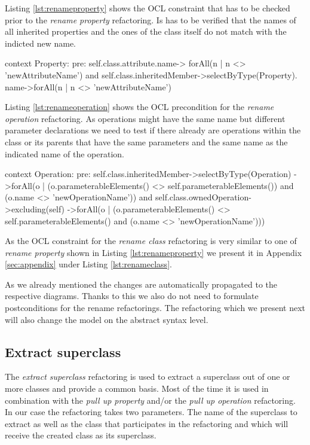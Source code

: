 \documentclass{llncs}
\begin{document}
Listing \ref{lst:renameproperty} shows the OCL constraint that has to be checked prior to the \textit{rename property} 
refactoring. Is has to be verified that the names of all inherited properties and the ones of the class itself do not match 
with the indicted new name.

\begin{lstsingle}[language=OCL,caption=OCL for \textit{rename property} refactoring,label=lst:renameproperty]
context Property:
pre:  self.class.attribute.name->
        forAll(n | n <> 'newAttributeName') 
      and 
      self.class.inheritedMember->selectByType(Property).
        name->forAll(n | n <> 'newAttributeName')
\end{lstsingle}

Listing \ref{lst:renameoperation} shows the OCL precondition for the \textit{rename operation} refactoring. As operations 
might have the same name but different parameter declarations we need to test if there already are operations within the 
class or its parents that have the same parameters and the same name as the indicated name of the operation.

\begin{lstsingle}[language=OCL,caption=OCL for \textit{rename operation} refactoring,label=lst:renameoperation]
context Operation:
pre:  self.class.inheritedMember->selectByType(Operation)
        ->forAll(o | (o.parameterableElements() <> 
          self.parameterableElements()) 
          and (o.name <> 'newOperationName')) 
      and 
      self.class.ownedOperation->excluding(self)
        ->forAll(o | (o.parameterableElements() <> 
          self.parameterableElements() 
          and (o.name <> 'newOperationName')))
\end{lstsingle}

As the OCL constraint for the \textit{rename class} refactoring is very similar to one of \textit{rename property} shown 
in Listing \ref{lst:renameproperty} we present it in Appendix \ref{sec:appendix} under Listing \ref{lst:renameclass}.

As we already mentioned the changes are automatically propagated to the respective diagrams. Thanks to this we also do 
not need to formulate postconditions for the rename refactorings. The refactoring which we present next will also 
change the model on the abstract syntax level.

\subsection{Extract superclass}
\label{sec:extract}
The \textit{extract superclass} refactoring is used to extract a superclass out of one or more classes and provide 
a common basis. Most of the time it is used in combination with the \textit{pull up property} and/or the \textit{pull 
up operation} refactoring.
In our case the refactoring takes two parameters. The name of the superclass to extract as well as
the class that participates in the refactoring and which will receive the created class as its superclass.
\end{document}
